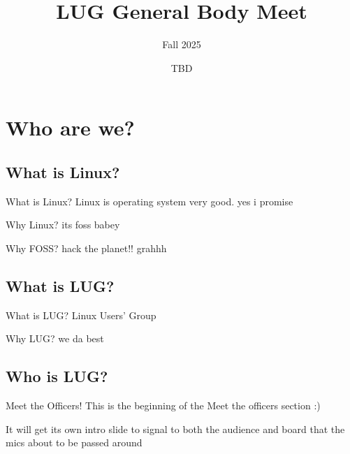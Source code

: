 \documentclass{beamer}
\title{LUG General Body Meet}
\subtitle{Fall 2025}
\date{TBD}
\institute{Linux Users Group @ UIC}
\begin{document}
  \begin{frame}
    \maketitle
  \end{frame}

  \begin{frame}
    \tableofcontents
  \end{frame}
  
  \section{Who are we?}
  \subsection{What is Linux?}
  \begin{frame}{What is Linux?}
    Linux is operating system very good. yes i promise
  \end{frame}

  \begin{frame}{Why Linux?}
    its foss babey
  \end{frame}
  
  \begin{frame}{Why FOSS?}
    hack the planet!! grahhh
  \end{frame}

  \subsection{What is LUG?}
  \begin{frame}{What is LUG?}
    Linux Users' Group
  \end{frame}

  \begin{frame}{Why LUG?}
    we da best
  \end{frame}

  \subsection{Who is LUG?}
  \begin{frame}{Meet the Officers!}
    This is the beginning of the Meet the officers section :)
    
    It will get its own intro slide to signal to both the audience and board that the mics about to be passed around

  \end{frame}
\end{document}
